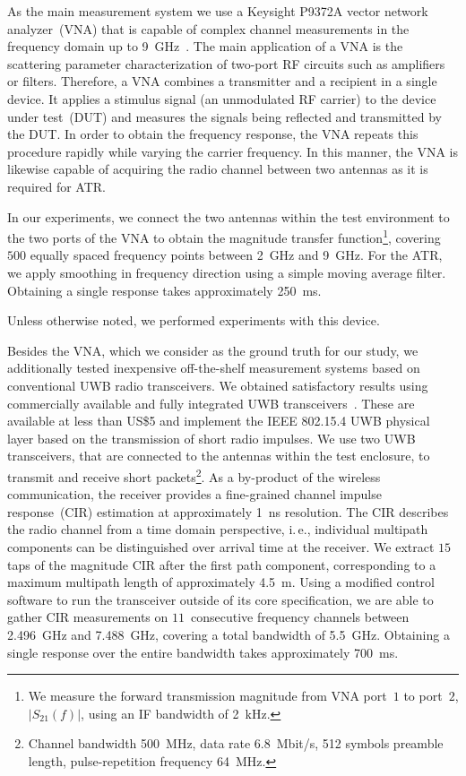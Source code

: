 \documentclass[conference]{IEEEtran}
\makeatletter
\newcommand{\ie}{i.\@\,e.\@\xspace}
\newcommand{\Paragraph}[1]{\smallskip\noindent{\bf #1.}}
\makeatother
\begin{document}
\Paragraph{Vector Network Analyzer}
As the main measurement system we use a Keysight P9372A vector network analyzer~(VNA) that is capable of complex channel measurements in the frequency domain up to \SI{9}{\GHz}~\cite{p9372a_manual}. The main application of a VNA is the scattering parameter characterization of two-port RF circuits such as amplifiers or filters. Therefore, a VNA combines a transmitter and a recipient in a single device. It applies a stimulus signal (an unmodulated RF carrier) to the device under test~(DUT) and measures the signals being reflected and transmitted by the DUT. In order to obtain the frequency response, the VNA repeats this procedure rapidly while varying the carrier frequency. In this manner, the VNA is likewise capable of acquiring the radio channel between two antennas as it is required for ATR. 

In our experiments, we connect the two antennas within the test environment to the two ports of the VNA to obtain the magnitude transfer function\footnote{We measure the forward transmission magnitude from VNA port~$1$ to port~$2$, $|S_{21}(f)|$, using an IF bandwidth of \SI{2}{\kHz}.}, covering $500$ equally spaced frequency points between \SI{2}{\GHz} and \SI{9}{GHz}. For the ATR, we apply smoothing in frequency direction using a simple moving average filter. Obtaining a single response takes approximately \SI{250}{\ms}.

Unless otherwise noted, we performed experiments with this device.

\Paragraph{Ultra-Wideband Radio}
Besides the VNA, which we consider as the ground truth for our study, we additionally tested inexpensive off-the-shelf measurement systems based on conventional UWB radio transceivers. We obtained satisfactory results using commercially available and fully integrated UWB transceivers~\cite{dw1000_manual}. These are available at less than US\$5 and implement the IEEE 802.15.4 UWB physical layer based on the transmission of short radio impulses. We use two UWB transceivers, that are connected to the antennas within the test enclosure, to transmit and receive short packets\footnote{Channel bandwidth \SI{500}{\MHz}, data rate \SI{6.8}{Mbit/s}, 512 symbols preamble length, pulse-repetition frequency \SI{64}{\MHz}.}. As a by-product of the wireless communication, the receiver provides a fine-grained channel impulse response~(CIR) estimation at approximately \SI{1}{\ns} resolution. The CIR describes the radio channel from a time domain perspective, \ie, individual multipath components can be distinguished over arrival time at the receiver. We extract $15$ taps of the magnitude CIR after the first path component, corresponding to a maximum multipath length of approximately \SI{4.5}{\m}. Using a modified control software to run the transceiver outside of its core specification, we are able to gather CIR measurements on $11$~consecutive frequency channels between \SI{2.496}{GHz} and \SI{7.488}{GHz}, covering a total bandwidth of \SI{5.5}{\GHz}. Obtaining a single response over the entire bandwidth takes approximately \SI{700}{\ms}.
\end{document}
